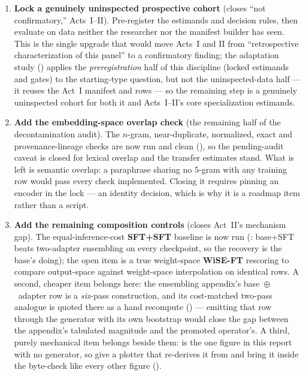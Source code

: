 \begin{enumerate}[leftmargin=1.9em,itemsep=3pt]
  \item \textbf{Lock a genuinely uninspected prospective cohort} (closes ``not confirmatory,'' Acts~I--II). Pre-register the estimands and decision rules, then evaluate on data neither the researcher nor the manifest builder has seen. This is the single upgrade that would move Acts~I and II from ``retrospective characterization of this panel'' to a confirmatory finding; the adaptation study () applies the \emph{preregistration} half of this discipline (locked estimands and gates) to the starting-type question, but not the uninspected-data half --- it reuses the Act~I manifest and rows --- so the remaining step is a genuinely uninspected cohort for both it and Acts~I--II's core specialization estimands.
  \item \textbf{Add the embedding-space overlap check} (the remaining half of the decontamination audit). The $n$-gram, near-duplicate, normalized, exact and provenance-lineage checks are now run and clean (), so the pending-audit caveat is closed for lexical overlap and the transfer estimates stand. What is left is semantic overlap: a paraphrase sharing no $5$-gram with any training row would pass every check implemented. Closing it requires pinning an encoder in the lock --- an identity decision, which is why it is a roadmap item rather than a script.
  \item \textbf{Add the remaining composition controls} (closes Act~II's mechanism gap). The equal-inference-cost \textbf{SFT+SFT} baseline is now run (: base+SFT beats two-adapter ensembling on every checkpoint, so the recovery is the base's doing); the open item is a true weight-space \textbf{WiSE-FT} rescoring \citep{wortsman2022wiseft} to compare output-space against weight-space interpolation on identical rows. A second, cheaper item belongs here: the ensembling appendix's base~$\oplus$~adapter row is a \emph{six}-pass construction, and its cost-matched two-pass analogue is quoted there as a hand recompute () --- emitting that row through the generator with its own bootstrap would close the gap between the appendix's tabulated magnitude and the promoted operator's. A third, purely mechanical item belongs beside them:  is the one figure in this report with no generator, so give  a plotter that re-derives it from  and bring it inside the byte-check like every other figure ().

\end{enumerate}
